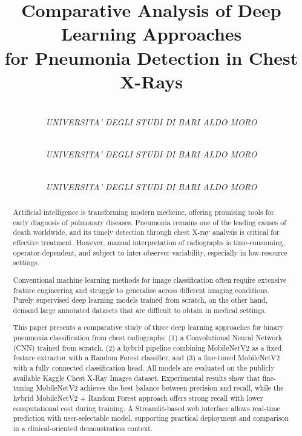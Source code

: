 \documentclass[conference]{IEEEtran}
\begin{document}
\title{Comparative Analysis of Deep Learning Approaches\\
for Pneumonia Detection in Chest X-Rays}

\author{
  \\
  \textit{UNIVERSITA’ DEGLI STUDI DI BARI
  ALDO MORO}\\
  \and
  \\
  \textit{UNIVERSITA’ DEGLI STUDI DI BARI
  	ALDO MORO}\\
  \and
  \\
  \textit{UNIVERSITA’ DEGLI STUDI DI BARI ALDO MORO}\\
}

\maketitle

\begin{abstract}
Artificial intelligence is transforming modern medicine, offering
promising tools for early diagnosis of pulmonary diseases.
Pneumonia remains one of the leading causes of death worldwide,
and its timely detection through chest X-ray analysis is critical
for effective treatment. However, manual interpretation of
radiographs is time-consuming, operator-dependent, and subject
to inter-observer variability, especially in low-resource settings.

Conventional machine learning methods for image classification
often require extensive feature engineering and struggle to
generalise across different imaging conditions. Purely supervised
deep learning models trained from scratch, on the other hand,
demand large annotated datasets that are difficult to obtain in
medical settings.

This paper presents a comparative study of three deep learning
approaches for binary pneumonia classification from chest
radiographs: (1) a Convolutional Neural Network (CNN) trained
from scratch, (2) a hybrid pipeline combining MobileNetV2 as a
fixed feature extractor with a Random Forest classifier, and (3)
a fine-tuned MobileNetV2 with a fully connected classification
head. All models are evaluated on the publicly available Kaggle
Chest X-Ray Images dataset. Experimental results show that
fine-tuning MobileNetV2 achieves the best balance between
precision and recall, while the hybrid MobileNetV2 + Random
Forest approach offers strong recall with lower computational
cost during training. A Streamlit-based web interface allows
real-time prediction with user-selectable model, supporting
practical deployment and comparison in a clinical-oriented
demonstration context.
\end{abstract}
\end{document}
